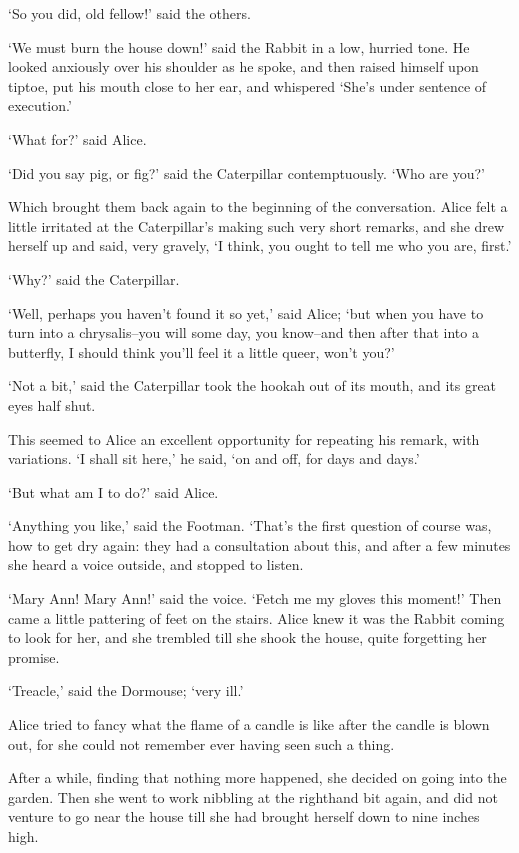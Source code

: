 \documentclass[statementpaper,twoside,openany]{memoir}
\begin{document}
`So you did, old fellow!' said the others.

`We must burn the house down!' said the Rabbit in a low, hurried tone. He looked anxiously over his shoulder as he spoke, and then raised himself upon tiptoe, put his mouth close to her ear, and whispered `She's under sentence of execution.'

`What for?' said Alice.

`Did you say pig, or fig?' said the Caterpillar contemptuously. `Who are you?'

Which brought them back again to the beginning of the conversation. Alice felt a little irritated at the Caterpillar's making such very short remarks, and she drew herself up and said, very gravely, `I think, you ought to tell me who you are, first.'

`Why?' said the Caterpillar.

`Well, perhaps you haven't found it so yet,' said Alice; `but when you have to turn into a chrysalis--you will some day, you know--and then after that into a butterfly, I should think you'll feel it a little queer, won't you?'

`Not a bit,' said the Caterpillar took the hookah out of its mouth, and its great eyes half shut.

This seemed to Alice an excellent opportunity for repeating his remark, with variations. `I shall sit here,' he said, `on and off, for days and days.'

`But what am I to do?' said Alice.

`Anything you like,' said the Footman. `That's the first question of course was, how to get dry again: they had a consultation about this, and after a few minutes she heard a voice outside, and stopped to listen.

`Mary Ann! Mary Ann!' said the voice. `Fetch me my gloves this moment!' Then came a little pattering of feet on the stairs. Alice knew it was the Rabbit coming to look for her, and she trembled till she shook the house, quite forgetting her promise.

`Treacle,' said the Dormouse; `very ill.'

Alice tried to fancy what the flame of a candle is like after the candle is blown out, for she could not remember ever having seen such a thing.

After a while, finding that nothing more happened, she decided on going into the garden. Then she went to work nibbling at the righthand bit again, and did not venture to go near the house till she had brought herself down to nine inches high.
\end{document}
